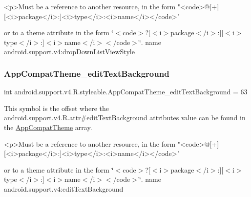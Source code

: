 \begin{DoxyVerb}      <p>Must be a reference to another resource, in the form "<code>@[+][<i>package</i>:]<i>type</i>:<i>name</i></code>"
\end{DoxyVerb}
 or to a theme attribute in the form \char`\"{}$<$code$>$?\mbox{[}$<$i$>$package$<$/i$>$\+:\mbox{]}\mbox{[}$<$i$>$type$<$/i$>$\+:\mbox{]}$<$i$>$name$<$/i$>$$<$/code$>$\char`\"{}.  name android.\+support.\+v4\+:drop\+Down\+List\+View\+Style \mbox{\label{classandroid_1_1support_1_1v4_1_1R_1_1styleable_a18052ba0b1c9793bc937f0c80db13b4f}} 
\subsubsection{\texorpdfstring{App\+Compat\+Theme\+\_\+edit\+Text\+Background}{AppCompatTheme\_editTextBackground}}
{\footnotesize\ttfamily int android.\+support.\+v4.\+R.\+styleable.\+App\+Compat\+Theme\+\_\+edit\+Text\+Background = 63\hspace{0.3cm}{\ttfamily [static]}}

This symbol is the offset where the \hyperlink{classandroid_1_1support_1_1v4_1_1R_1_1attr_a80537fe05e995799ee013712788c6ca6}{android.\+support.\+v4.\+R.\+attr\#edit\+Text\+Background} attribute\textquotesingle{}s value can be found in the \hyperlink{classandroid_1_1support_1_1v4_1_1R_1_1styleable_ac07ebbe62ed977f6dcaadc6397840ace}{App\+Compat\+Theme} array.

\begin{DoxyVerb}      <p>Must be a reference to another resource, in the form "<code>@[+][<i>package</i>:]<i>type</i>:<i>name</i></code>"
\end{DoxyVerb}
 or to a theme attribute in the form \char`\"{}$<$code$>$?\mbox{[}$<$i$>$package$<$/i$>$\+:\mbox{]}\mbox{[}$<$i$>$type$<$/i$>$\+:\mbox{]}$<$i$>$name$<$/i$>$$<$/code$>$\char`\"{}.  name android.\+support.\+v4\+:edit\+Text\+Background \mbox{\label{classandroid_1_1support_1_1v4_1_1R_1_1styleable_a61b858b456732138a1c8d3fe6521a2a2}} 
